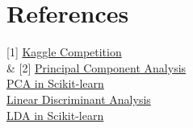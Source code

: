 \documentclass[conference]{IEEEtran}
\begin{document}
\section{References}
    [1] \href{https://www.kaggle.com/competitions/sml-project/overview}{Kaggle Competition} \\ \relax
    & [2] \href{https://en.wikipedia.org/wiki/Principal_component_analysis}{Principal Component Analysis} \\ \relax
    [3] \href{https://scikit-learn.org/stable/modules/generated/sklearn.decomposition.PCA.html}{PCA in Scikit-learn} \\ \relax
    [4] \href{https://en.wikipedia.org/wiki/Linear_discriminant_analysis}{Linear Discriminant Analysis} \\ \relax
    [5] \href{https://scikit-learn.org/stable/modules/generated/sklearn.discriminant_analysis.LinearDiscriminantAnalysis.html}{LDA in Scikit-learn} \\ \relax
\end{document}
